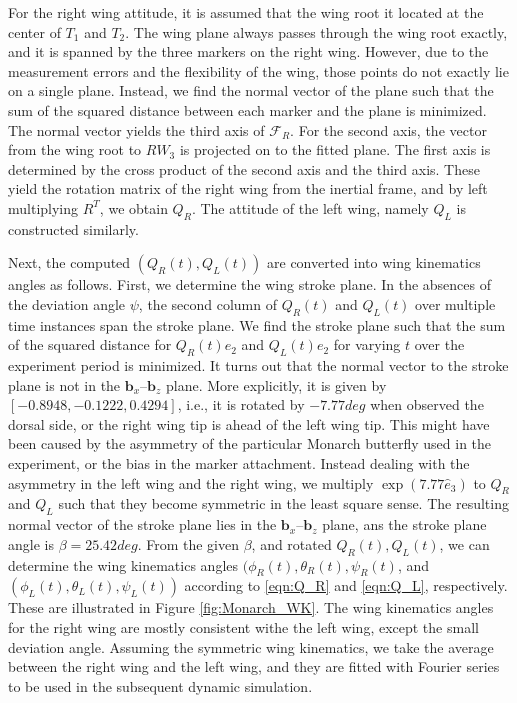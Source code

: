 \documentclass[conf]{new-aiaa}
\begin{document}
For the right wing attitude, it is assumed that the wing root it located at the center of $T_1$ and $T_2$.
The wing plane always passes through the wing root exactly, and it is spanned by the three markers on the right wing. 
However, due to the measurement errors and the flexibility of the wing, those points do not exactly lie on a single plane. 
Instead, we find the normal vector of the plane such that the sum of the squared distance between each marker and the plane is minimized. 
The normal vector yields the third axis of $\mathcal{F}_R$. 
For the second axis, the vector from the wing root to $RW_3$ is projected on to the fitted plane. 
The first axis is determined by the cross product of the second axis and the third axis. 
These yield the rotation matrix of the right wing from the inertial frame, and by left multiplying $R^T$, we obtain $Q_R$. 
The attitude of the left wing, namely $Q_L$ is constructed similarly. 

Next, the computed $(Q_R(t),Q_L(t))$ are converted into wing kinematics angles as follows. 
First, we determine the wing stroke plane. 
In the absences of the deviation angle $\psi$, the second column of $Q_R(t)$ and $Q_L(t)$ over multiple time instances span the stroke plane. 
We find the stroke plane such that the sum of the squared distance for $Q_R(t) e_2$ and $Q_L(t) e_2$ for varying $t$ over the experiment period is minimized. 
It turns out that the normal vector to the stroke plane is not in the $\mathbf{b}_x$--$\mathbf{b}_z$ plane. 
More explicitly, it is given by $[   -0.8948, -0.1222, 0.4294]$, i.e., it is rotated by $-7.77\si{deg}$ when observed the dorsal side,
or the right wing tip is ahead of the left wing tip.
This might have been caused by the asymmetry of the particular Monarch butterfly used in the experiment, or the bias in the marker attachment.
Instead dealing with the asymmetry in the left wing and the right wing, we multiply $\exp(7.77\hat e_3)$ to $Q_R$ and $Q_L$ such that they become symmetric in the least square sense. 
The resulting normal vector of the stroke plane lies in the $\mathbf{b}_x$--$\mathbf{b}_z$ plane, ans the stroke plane angle is $\beta = 25.42\si{deg}$.
From the given $\beta$, and rotated $Q_R(t),Q_L(t)$, we can determine the wing kinematics angles $(\phi_R(t),\theta_R(t),\psi_R(t)$, and $(\phi_L(t),\theta_L(t),\psi_L(t))$ according to \eqref{eqn:Q_R} and \eqref{eqn:Q_L}, respectively. 
These are illustrated in Figure \ref{fig:Monarch_WK}.
The wing kinematics angles for the right wing are mostly consistent withe the left wing, except the small deviation angle. 
Assuming the symmetric wing kinematics, we take the average between the right wing and the left wing, 
and they are fitted with Fourier series to be used in the subsequent dynamic simulation. 
\end{document}
